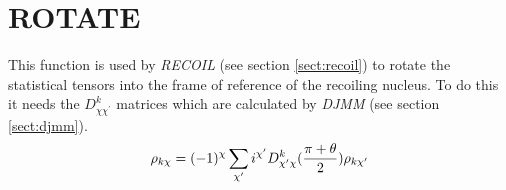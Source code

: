 \section{ROTATE}
\label{sect:rotate}

\noindent This function is used by {\em RECOIL} (see section
\ref{sect:recoil}) to rotate the statistical tensors into the frame of
reference of the recoiling nucleus. To do this it needs the
$D^k_{\chi\chi^\prime}$ matrices which are calculated by {\em DJMM} (see
section \ref{sect:djmm}).\\

\begin{equation}
 \rho_{k \chi} = (-1)^\chi
  \sum_{\chi^\prime}{i^{\chi^\prime} D^k_{\chi^\prime \chi}
     ({\pi + \theta \over 2}) \rho_{k \chi^\prime}}
\end{equation}
